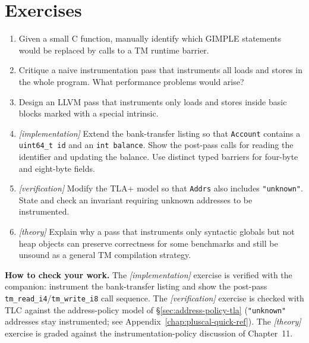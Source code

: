 \section{Exercises}
\begin{enumerate}
    \item Given a small C function, manually identify which GIMPLE statements would be replaced by calls to a TM runtime barrier.
    \item Critique a naive instrumentation pass that instruments all loads and stores in the whole program. What performance problems would arise?
    \item Design an LLVM pass that instruments only loads and stores inside basic blocks marked with a special intrinsic.
    \item \emph{[implementation]} Extend the bank-transfer listing so that \texttt{Account} contains a \texttt{uint64\_t id} and an \texttt{int balance}. Show the post-pass calls for reading the identifier and updating the balance. Use distinct typed barriers for four-byte and eight-byte fields.
    \item \emph{[verification]} Modify the TLA+ model so that \texttt{Addrs} also includes \texttt{"unknown"}. State and check an invariant requiring unknown addresses to be instrumented.
    \item \emph{[theory]} Explain why a pass that instruments only syntactic globals but not heap objects can preserve correctness for some benchmarks and still be unsound as a general TM compilation strategy.
\end{enumerate}

\textbf{How to check your work.} The \emph{[implementation]} exercise is
verified with the companion: instrument the bank-transfer listing and show
the post-pass \texttt{tm\_read\_i4}/\texttt{tm\_write\_i8} call sequence.  The
\emph{[verification]} exercise is checked with TLC against the address-policy
model of \S\ref{sec:address-policy-tla} (\texttt{"unknown"} addresses stay
instrumented; see Appendix~\ref{chap:pluscal-quick-ref}).  The
\emph{[theory]} exercise is graded against the instrumentation-policy
discussion of Chapter~11.

